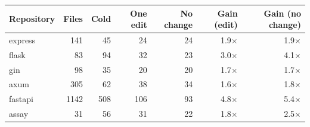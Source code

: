 \begin{tabular}{lrrrrrr}
\toprule
Repository & Files & Cold & One edit & No change & Gain (edit) & Gain (no change) \\
\midrule
express & 141 & 45 & 24 & 24 & 1.9$\times$ & 1.9$\times$ \\
flask & 83 & 94 & 32 & 23 & 3.0$\times$ & 4.1$\times$ \\
gin & 98 & 35 & 20 & 20 & 1.7$\times$ & 1.7$\times$ \\
axum & 305 & 62 & 38 & 34 & 1.6$\times$ & 1.8$\times$ \\
fastapi & 1142 & 508 & 106 & 93 & 4.8$\times$ & 5.4$\times$ \\
assay & 31 & 56 & 31 & 22 & 1.8$\times$ & 2.5$\times$ \\
\bottomrule
\end{tabular}
